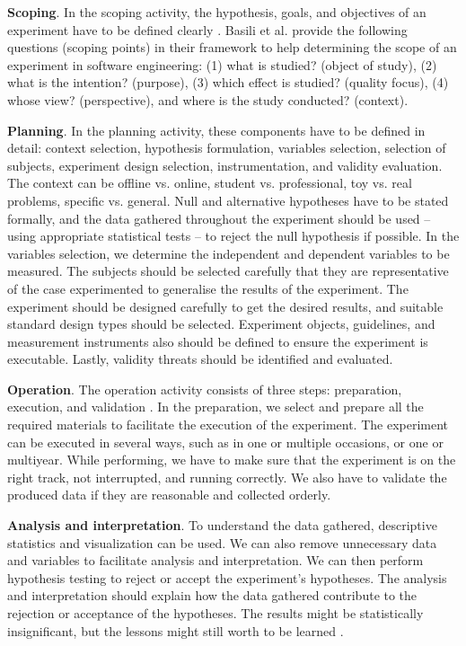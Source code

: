 \textbf{Scoping}. In the scoping activity, the hypothesis, goals, and objectives of an experiment have to be defined clearly \cite{DBLP:books/daglib/0029933/Wohlin}. Basili et al. \cite{basili1988tame} provide the following questions (scoping points) in their framework to help determining the scope of an experiment in software engineering: (1) what is studied? (object of study), (2) what is the intention? (purpose), (3) which effect is studied? (quality focus), (4) whose view? (perspective), and where is the study conducted? (context).

\textbf{Planning}. In the planning activity, these components have to be defined in detail: context selection, hypothesis formulation, variables selection, selection of subjects, experiment design selection, instrumentation, and validity evaluation\cite{DBLP:books/daglib/0029933/Wohlin}. The context can be offline vs. online, student vs. professional, toy vs. real problems, specific vs. general. Null and alternative hypotheses have to be stated formally, and the data gathered throughout the experiment should be used -- using appropriate statistical tests -- to reject the null hypothesis if possible. In the variables selection, we determine the independent and dependent variables to be measured. The subjects should be selected carefully that they are representative of the case experimented to generalise the results of the experiment. The experiment should be designed carefully to get the desired results, and suitable standard design types should be selected. Experiment objects, guidelines, and measurement instruments also should be defined to ensure the experiment is executable. Lastly, validity threats should be identified and evaluated.

\textbf{Operation}. The operation activity consists of three steps: preparation, execution, and validation \cite{DBLP:books/daglib/0029933/Wohlin}. 
In the preparation, we select and prepare all the required materials to facilitate the execution of the experiment. The experiment can be executed in several ways, such as in one or multiple occasions, or one or multiyear.  While performing, we have to make sure that the experiment is on the right track, not interrupted, and running correctly. We also have to validate the produced data if they are reasonable and collected orderly.

\textbf{Analysis and interpretation}.
To understand the data gathered, descriptive statistics and visualization can be used. We can also remove unnecessary data and variables to facilitate analysis and interpretation. We can then perform hypothesis testing to reject or accept the experiment's hypotheses. The analysis and interpretation should explain how the data gathered contribute to the rejection or acceptance of the hypotheses. The results might be statistically insignificant, but the lessons might still worth to be learned \cite{DBLP:books/daglib/0029933/Wohlin}. 

